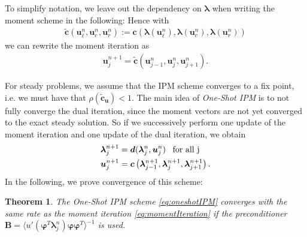 \documentclass[10pt, a4paper, titlepage, bibliography=totocnumbered]{article}
\newtheorem{theorem}{Theorem}[section]
\begin{document}
To simplify notation, we leave out the dependency on $\bm{\lambda}$ when writing the moment scheme in the following: Hence with 
\begin{align*}
\bm{\tilde c}\left(\bm{u}_{\ell}^n,\bm{u}_{c}^n,\bm{u}_{r}^n\right):=\bm{c}\left(\bm{\lambda}(\bm{u}_{\ell}^n),\bm{\lambda}(\bm{u}_{c}^n),\bm{\lambda}(\bm{u}_{r}^n)\right)
\end{align*}
we can rewrite the moment iteration as
\begin{align}
\bm{u}_j^{n+1} = \bm{\tilde c}\left(\bm{u}_{j-1}^n,\bm{u}_{j}^n,\bm{u}_{j+1}^n\right).
\end{align}

For steady problems, we assume that the IPM scheme converges to a fix point, i.e. we must have that $\rho (\bm{\tilde c}_{\bm{u}})<1$. The main idea of \textit{One-Shot IPM} is to not fully converge the dual iteration, since the moment vectors are not yet converged to the exact steady solution. So if we successively perform one update of the moment iteration and one update of the dual iteration, we obtain 
\begin{subequations}\label{eq:oneshotIPM}
\begin{align}
&\bm{\lambda}_{j}^{n+1} =  \bm{d}(\bm{\lambda}_j^{n},\bm{u}_j^{n}) \enskip \text{ for all j} \label{eq:oneshotIPMdual}\\
&\bm{u}_j^{n+1} =  \bm{c}\left(\bm{\lambda}_{j-1}^{n+1},\bm{\lambda}_{j}^{n+1},\bm{\lambda}_{j+1}^{n+1}\right)\label{eq:oneshotIPMmoment}.
\end{align}
\end{subequations}
In the following, we prove convergence of this scheme:
\begin{theorem}
The \textit{One-Shot IPM} scheme \eqref{eq:oneshotIPM} converges with the same rate as the moment iteration \eqref{eq:momentIteration} if the preconditioner $\bm{B} = \langle u'(\bm{\varphi}^T\bm{\lambda}_j^{n})\bm{\varphi}\bm{\varphi}^T\rangle^{-1}$ is used.
\end{theorem}
\end{document}
